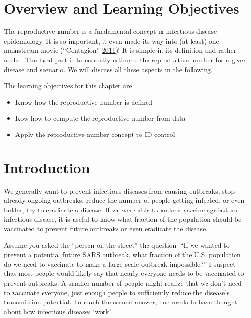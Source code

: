 \documentclass[]{book}
\providecommand{\tightlist}{%
  \setlength{\itemsep}{0pt}\setlength{\parskip}{0pt}}
\theoremstyle{definition}
\theoremstyle{definition}
\theoremstyle{definition}
\theoremstyle{remark}
\begin{document}
\hypertarget{overview-and-learning-objectives-3}{%
\section{Overview and Learning
Objectives}\label{overview-and-learning-objectives-3}}

The reproductive number is a fundamental concept in infectious disease
epidemiology. It is so important, it even made its way into (at least)
one mainstream movie (``Contagion''
\protect\hyperlink{ref-contagionmovie}{2011})! It is simple in its
definition and rather useful. The hard part is to correctly estimate the
reproductive number for a given disease and scenario. We will discuss
all these aspects in the following.

The learning objectives for this chapter are:

\begin{itemize}
\tightlist
\item
  Know how the reproductive number is defined
\item
  Kow how to compute the reproductive number from data
\item
  Apply the reproductive number concept to ID control
\end{itemize}

\hypertarget{introduction-2}{%
\section{Introduction}\label{introduction-2}}

We generally want to prevent infectious diseases from causing outbreaks,
stop already ongoing outbreaks, reduce the number of people getting
infected, or even bolder, try to eradicate a disease. If we were able to
make a vaccine against an infectious disease, it is useful to know what
fraction of the population should be vaccinated to prevent future
outbreaks or even eradicate the disease.

Assume you asked the ``person on the street'' the question: ``If we
wanted to prevent a potential future SARS outbreak, what fraction of the
U.S. population do we need to vaccinate to make a large-scale outbreak
impossible?'' I suspect that most people would likely say that nearly
everyone needs to be vaccinated to prevent outbreaks. A smaller number
of people might realize that we don't need to vaccinate everyone, just
enough people to sufficiently reduce the disease's transmission
potential. To reach the second answer, one needs to have thought about
how infectious diseases `work'.
\end{document}
